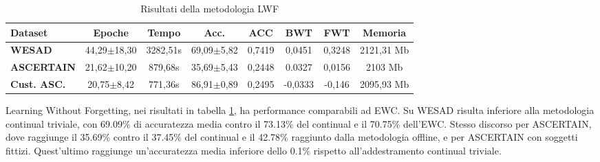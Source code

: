 \begin{table}[h]
\footnotesize
    \begin{tabular}{l|c|c|c|c|c|c|c}
        \textbf{Dataset} & \textbf{Epoche} & \textbf{Tempo} & \textbf{Acc.} & \textbf{ACC} & \textbf{BWT} & \textbf{FWT} & \textbf{Memoria}\\
        \hline
        \textbf{WESAD} & 44,29$\pm$18,30 & 3282,51s & 69,09$\pm$5,82 & 0,7419 & 0,0451 & 0,3248 & 2121,31 Mb\\
        \textbf{ASCERTAIN} & 21,62$\pm$10,20 & 879,68s & 35,69$\pm$5,43 & 0,2448 & 0.0327 & 0,0156 & 2103 Mb\\
        \textbf{Cust. ASC.} & 20,75$\pm$8,42 & 771,36s & 86,91$\pm$0,89 & 0,2495 & -0,0333 & -0,146 & 2095,93 Mb\\
    \end{tabular}
    \caption{Risultati della metodologia LWF}
    \label{tab:reslwf}
\end{table}
Learning Without Forgetting, nei risultati in tabella \ref{tab:reslwf}, ha performance comparabili ad EWC. Su WESAD risulta inferiore alla metodologia continual triviale, con 69.09\% di accuratezza media contro il 73.13\% del continual e il 70.75\% dell'EWC. Stesso discorso per ASCERTAIN, dove raggiunge il 35.69\% contro il 37.45\% del continual e il 42.78\% raggiunto dalla metodologia offline, e per ASCERTAIN con soggetti fittizi. Quest'ultimo raggiunge un'accuratezza media inferiore dello 0.1\% rispetto all'addestramento continual triviale.